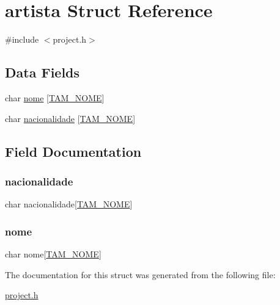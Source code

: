 \hypertarget{structartista}{}\section{artista Struct Reference}
\label{structartista}


{\ttfamily \#include $<$project.\+h$>$}

\subsection*{Data Fields}
\begin{DoxyCompactItemize}
\item 
char \mbox{\hyperlink{structartista_a69b32c1c4f965a4119eabc9f94886621}{nome}} \mbox{[}\mbox{\hyperlink{project_8h_ad0e480e07eae04b077948c75deb75422}{T\+A\+M\+\_\+\+N\+O\+ME}}\mbox{]}
\item 
char \mbox{\hyperlink{structartista_a1ea0358b1dadca215efb6586f6714271}{nacionalidade}} \mbox{[}\mbox{\hyperlink{project_8h_ad0e480e07eae04b077948c75deb75422}{T\+A\+M\+\_\+\+N\+O\+ME}}\mbox{]}
\end{DoxyCompactItemize}


\subsection{Field Documentation}
\mbox{\label{structartista_a1ea0358b1dadca215efb6586f6714271}} 
\subsubsection{\texorpdfstring{nacionalidade}{nacionalidade}}
{\footnotesize\ttfamily char nacionalidade\mbox{[}\mbox{\hyperlink{project_8h_ad0e480e07eae04b077948c75deb75422}{T\+A\+M\+\_\+\+N\+O\+ME}}\mbox{]}}

\mbox{\label{structartista_a69b32c1c4f965a4119eabc9f94886621}} 
\subsubsection{\texorpdfstring{nome}{nome}}
{\footnotesize\ttfamily char nome\mbox{[}\mbox{\hyperlink{project_8h_ad0e480e07eae04b077948c75deb75422}{T\+A\+M\+\_\+\+N\+O\+ME}}\mbox{]}}



The documentation for this struct was generated from the following file\+:\begin{DoxyCompactItemize}
\item 
\mbox{\hyperlink{project_8h}{project.\+h}}\end{DoxyCompactItemize}
